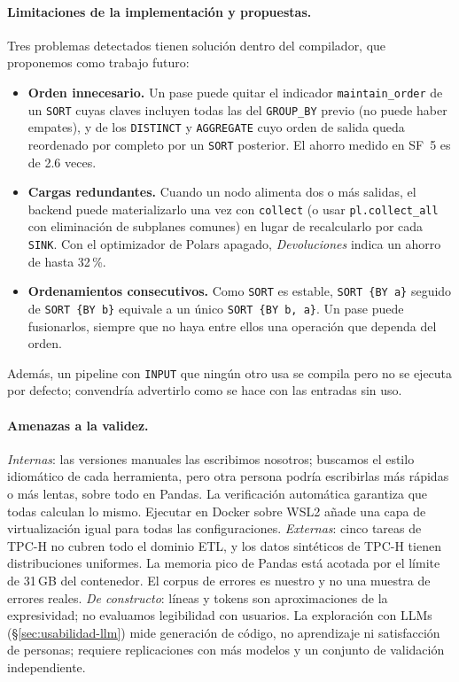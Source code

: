 \documentclass[sigplan,screen,nonacm]{acmart}
\begin{document}
\paragraph{Limitaciones de la implementación y propuestas.} Tres problemas detectados tienen
solución dentro del compilador, que proponemos como trabajo futuro:
\begin{itemize}
  \item \textbf{Orden innecesario.} Un pase puede quitar el indicador
    \texttt{maintain\_order} de un
    \texttt{SORT} cuyas claves incluyen todas las del \texttt{GROUP\_BY} previo (no puede haber
    empates), y de los \texttt{DISTINCT} y \texttt{AGGREGATE} cuyo orden de salida queda
    reordenado por completo por un \texttt{SORT} posterior. El ahorro medido en SF~5 es de
    2.6 veces.
  \item \textbf{Cargas redundantes.} Cuando un nodo alimenta dos o más salidas, el backend
    puede materializarlo una vez con \texttt{collect} (o usar \texttt{pl.collect\_all} con
    eliminación de subplanes comunes) en lugar de recalcularlo por cada \texttt{SINK}. Con el
    optimizador de Polars apagado, \emph{Devoluciones} indica un ahorro de hasta 32\,\%.
  \item \textbf{Ordenamientos consecutivos.} Como \texttt{SORT} es estable,
    \texttt{SORT \{BY a\}} seguido de \texttt{SORT \{BY b\}} equivale a un único
    \texttt{SORT \{BY b, a\}}. Un pase puede fusionarlos, siempre que no haya entre ellos una
    operación que dependa del orden.
\end{itemize}
Además, un pipeline con \texttt{INPUT} que ningún otro usa se compila pero no se ejecuta por
defecto; convendría advertirlo como se hace con las entradas sin uso.

\paragraph{Amenazas a la validez.}
\emph{Internas}: las versiones manuales las escribimos nosotros; buscamos el estilo
idiomático de cada herramienta, pero otra persona podría escribirlas más rápidas o más
lentas, sobre todo en Pandas. La verificación automática garantiza que todas calculan lo
mismo. Ejecutar en Docker sobre WSL2 añade una capa de virtualización igual para todas las
configuraciones. \emph{Externas}: cinco tareas de TPC-H no cubren todo el dominio ETL, y los
datos sintéticos de TPC-H tienen distribuciones uniformes. La memoria pico de Pandas está
acotada por el límite de 31\,GB del contenedor. El corpus de errores es nuestro y no una
muestra de errores reales. \emph{De constructo}: líneas y tokens son aproximaciones de la
expresividad; no evaluamos legibilidad con usuarios.
La exploración con LLMs (\S\ref{sec:usabilidad-llm}) mide generación de código,
no aprendizaje ni satisfacción de personas; requiere replicaciones con más modelos
y un conjunto de validación independiente.
\end{document}

